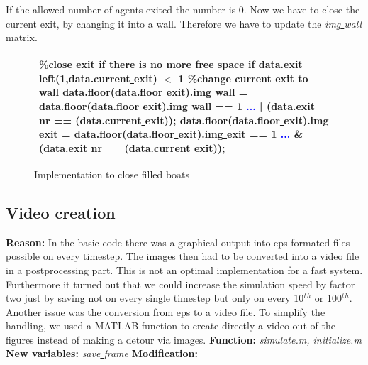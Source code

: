 \documentclass[11pt]{article}
\begin{document}
If the allowed number of agents exited the number is 0. Now we have to close the current exit, by changing it into a wall. Therefore we have to update the \textit{img\underline{ }wall} matrix.
\begin{figure}[h!]
\centering
\begin{tabular}
{|>{\large}m{\textwidth}|} \hline
\bigskip
\textcolor{commentcolor}{\%close exit if there is no more free space}
\newline
\textcolor{keywordcolor}{if} data.exit\underline{ } left(1,data.current\underline{ }exit) $<$ 1
\newline
\textcolor{commentcolor}{\%change current exit to wall}
\newline
data.floor(data.floor\underline{ }exit).img\underline{ }wall = data.floor(data.floor\underline{ }exit).img\underline{ }wall == 1 \textcolor{blue}{...}
\newline
| (data.exit\underline{ }nr == (data.current\underline{ }exit));
\newline
data.floor(data.floor\underline{ }exit).img\underline{ }exit = data.floor(data.floor\underline{ }exit).img\underline{ }exit == 1 \textcolor{blue}{...}
\newline
\& (data.exit\underline{ }nr ~= (data.current\underline{ }exit));
\bigskip
\\ \hline
\end{tabular}
\caption{Implementation to close filled  boats}
\end{figure}
\newpage

\subsection{Video creation}
\textbf{Reason:}
\newline
In the basic code there was a graphical output into eps-formated files possible on every timestep. The images then had to be converted into a video file in a postprocessing part. This is not an optimal implementation for a fast system. Furthermore it turned out that we could increase the simulation speed by factor two just by saving not on every single timestep but only on every 10$^t$$^h$ or 100$^t$$^h$. Another issue was the conversion from eps to a video file. To simplify the handling, we used a MATLAB function to create directly a video out of the figures instead of making a detour via images.
\newline
\textbf{Function:}
\newline
\textit{simulate.m, initialize.m}
\newline
\textbf{New variables:}
\newline
\textit{save\underline{ }frame}
\newline
\textbf{Modification:}
\newline
\end{document}
